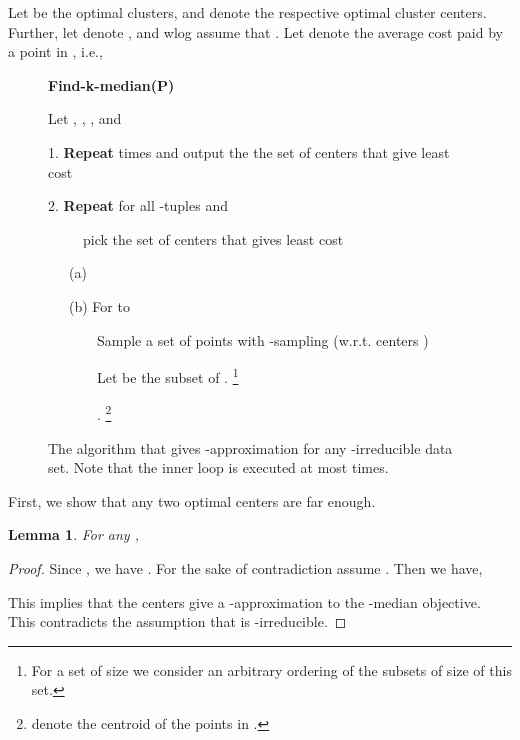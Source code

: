 \documentclass[a4paper]{article}
\newtheorem{lemma}[theorem]{Lemma}
\begin{document}
Let  be the optimal clusters, and  denote the respective optimal cluster centers. 
Further, let  denote , and wlog assume that . 
Let  denote the average cost paid by a point in , i.e.,


\begin{center}
\begin{figure}
\begin{boxedminipage}{5in}
{\bf Find-k-median(P)}

\hspace{0.1in} Let , , , and 

\hspace{0.1in} 1. {\bf Repeat}  times and output the the set of centers  that give least cost

\hspace{0.3in} 2. {\bf Repeat} for all -tuples  and

\hspace{0.3in} \ \ \ \ \ pick the set of centers  that gives least cost

\hspace{0.5in} \ \ \ (a) 

\hspace{0.5in} \ \ \ (b) For  to 

\hspace{0.7in}\ \ \ \ \  \ \ Sample a set  of  points with -sampling (w.r.t. centers )

\hspace{0.7in} \ \ \ \ \ \ \ Let  be the  subset of . \footnote{For a set of size  we consider an arbitrary ordering of the subsets of size  of this set.}


\hspace{0.7in} \ \ \ \ \ \ \ . \footnote{ denote the centroid of the points in .}

\end{boxedminipage}
\caption{The algorithm that gives -approximation for any -irreducible data set. 
Note that the inner loop is executed at most   times. }
\label{fig:k-repeat}
\end{figure}
\end{center}

First, we show that any two optimal centers are far enough.
\begin{lemma}
For any ,

\end{lemma}
\begin{proof}
Since , we have .
For the sake of contradiction assume . Then we have,

This implies that the centers  give a -approximation to the
-median objective. This contradicts the assumption that  is -irreducible.
\end{proof}
\end{document}
